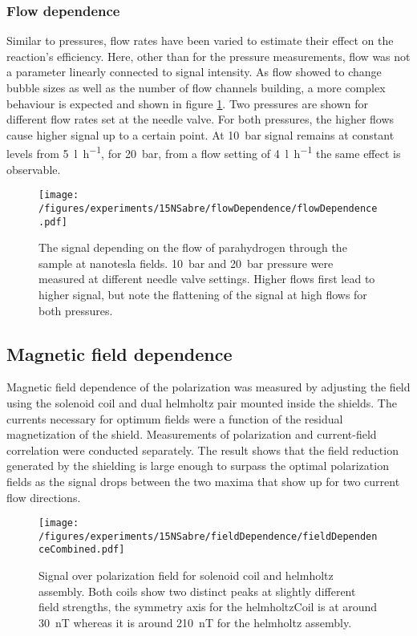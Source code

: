     \subsubsection{Flow dependence}
    Similar to pressures, flow rates have been varied to estimate their effect on the reaction's efficiency. Here, other than for the pressure measurements, flow was not a parameter linearly connected to signal intensity. As flow showed to change bubble sizes as well as the number of flow channels building, a more complex behaviour is expected and shown in figure \ref{fig:results:15N:flowDependence}. Two pressures are shown for different flow rates set at the needle valve. For both pressures, the higher flows cause higher signal up to a certain point. At \SI{10}{\bar} signal remains at constant levels from \SI{5}{\litre\per\hour}, for \SI{20}{\bar}, from a flow setting of \SI{4}{\litre\per\hour} the same effect is observable.
        \begin{figure}
            \label{fig:results:15N:flowDependence}
            \texttt{[image: /figures/experiments/15NSabre/flowDependence/flowDependence.pdf]}
            \caption[Flow dependence]{The signal depending on the flow of parahydrogen through the sample at nanotesla fields. \SI{10}{\bar} and \SI{20}{\bar} pressure were measured at different needle valve settings. Higher flows first lead to higher signal, but note the flattening of the signal at high flows for both pressures.}
        \end{figure}
    \subsection{Magnetic field dependence}
        Magnetic field dependence of the polarization was measured by adjusting the field using the solenoid coil and dual helmholtz pair mounted inside the shields. The currents necessary for optimum fields were a function of the residual magnetization of the shield. Measurements of polarization and current-field correlation were conducted separately. The result shows that the field reduction generated by the shielding is large enough to surpass the optimal polarization fields as the signal drops between the two maxima that show up for two current flow directions.
        \begin{figure}
            \label{fig:results:15N:fieldDependence}
            \texttt{[image: /figures/experiments/15NSabre/fieldDependence/fieldDependenceCombined.pdf]}
            \caption[Magnetic field dependence]{Signal over polarization field for solenoid coil and helmholtz assembly. Both coils show two distinct peaks at slightly different field strengths, the symmetry axis for the helmholtzCoil is at around \SI{30}{\nano\tesla} whereas it is around \SI{210}{\nano\tesla} for the helmholtz assembly.}
        \end{figure}
